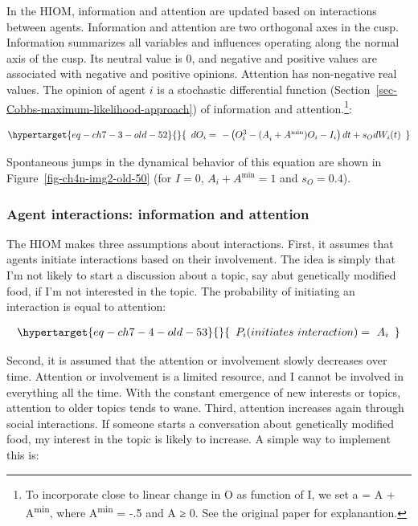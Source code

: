 \documentclass[
  a4paper,
  DIV=11,
  numbers=noendperiod,
  oneside]{scrreprt}
\begin{document}
In the HIOM, information and attention are updated based on interactions
between agents. Information and attention are two orthogonal axes in the
cusp. Information summarizes all variables and influences operating
along the normal axis of the cusp. Its neutral value is 0, and negative
and positive values are associated with negative and positive opinions.
Attention has non-negative real values. The opinion of agent \(i\) is a
stochastic differential function
(Section~\ref{sec-Cobbs-maximum-likelihood-approach}) of information and
attention.\footnote{To incorporate close to linear change in O as
  function of I, we set a = A + A\textsuperscript{min}, where
  A\textsuperscript{min} = -.5 and A ≥ 0. See the original paper for
  explanantion.}:

\begin{equation}\protect\hypertarget{eq-ch7-3-old-52}{}{\begin{array}{r}
dO_{i} = \  - \left( O_{i}^{3} - {(A}_{i} + A^{\min})O_{i} - I_{i} \right)dt + s_{O}dW_{i}(t)
\end{array}}\label{eq-ch7-3-old-52}\end{equation}

Spontaneous jumps in the dynamical behavior of this equation are shown
in Figure~\ref{fig-ch4n-img2-old-50} (for \(I = 0\),
\(A_{i} + A^{\min} = 1\) and \(s_{O} = 0.4\)).

\hypertarget{sec-Agent-interactions-information-and-attention}{%
\subsubsection{Agent interactions: information and
attention}\label{sec-Agent-interactions-information-and-attention}}

The HIOM makes three assumptions about interactions. First, it assumes
that agents initiate interactions based on their involvement. The idea
is simply that I'm not likely to start a discussion about a topic, say
abut genetically modified food, if I'm not interested in the topic. The
probability of initiating an interaction is equal to attention:

\begin{equation}\protect\hypertarget{eq-ch7-4-old-53}{}{\begin{array}{r}
P_{i}(initiates\ interaction) = \ A_{i}
\end{array}}\label{eq-ch7-4-old-53}\end{equation}

Second, it is assumed that the attention or involvement slowly decreases
over time. Attention or involvement is a limited resource, and I cannot
be involved in everything all the time. With the constant emergence of
new interests or topics, attention to older topics tends to wane. Third,
attention increases again through social interactions. If someone starts
a conversation about genetically modified food, my interest in the topic
is likely to increase. A simple way to implement this is:
\end{document}
